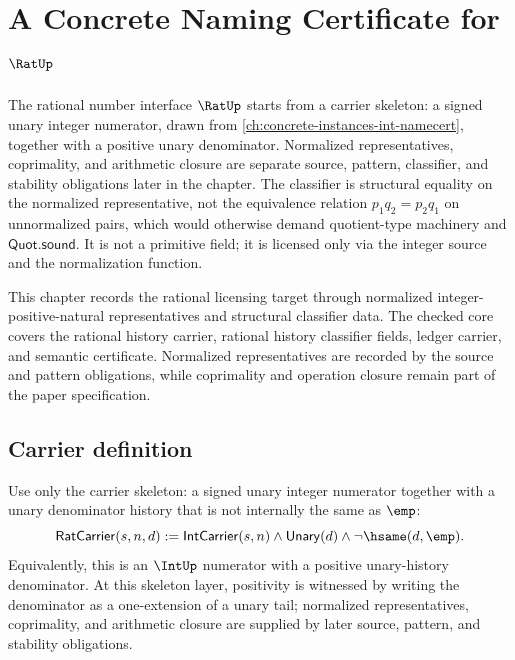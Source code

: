 \chapter{A Concrete Naming Certificate for $\RatUp$}
\label{ch:concrete-instances-rat-namecert}

The rational number interface $\RatUp$ starts from a carrier skeleton: a signed unary integer numerator, drawn from \autoref{ch:concrete-instances-int-namecert}, together with a positive unary denominator. Normalized representatives, coprimality, and arithmetic closure are separate source, pattern, classifier, and stability obligations later in the chapter. The classifier is structural equality on the normalized representative, not the equivalence relation $p_1 q_2 = p_2 q_1$ on unnormalized pairs, which would otherwise demand quotient-type machinery and $\mathsf{Quot.sound}$. It is not a primitive field; it is licensed only via the integer source and the normalization function.

\begin{remark}
\label{rem:concrete-instances-rat-namecert-roadmap}
This chapter records the rational licensing target through normalized
integer-positive-natural representatives and structural classifier data.
The checked core covers the rational history carrier, rational history classifier fields, ledger carrier, and semantic certificate. Normalized representatives are recorded by the source and pattern obligations, while coprimality and operation closure remain part of the paper specification.
\end{remark}

\section{Carrier definition}

\begin{definition}
\label{def:rat-carrier}
Use only the carrier skeleton: a signed unary integer numerator together with a unary denominator history that is not internally the same as $\emp$:
$$
  \mathsf{RatCarrier}(s,n,d)
  :=
  \mathsf{IntCarrier}(s,n)\land \mathsf{Unary}(d)\land \neg\hsame(d,\emp).
$$
Equivalently, this is an $\IntUp$ numerator with a positive unary-history denominator. At this skeleton layer, positivity is witnessed by writing the denominator as a one-extension of a unary tail; normalized representatives, coprimality, and arithmetic closure are supplied by later source, pattern, and stability obligations.
\end{definition}

